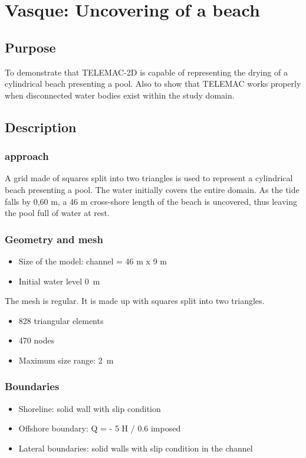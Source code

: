 \chapter{Vasque: Uncovering of  a beach}
\section{Purpose}
To demonstrate that TELEMAC-2D is capable of representing the drying of a
cylindrical beach presenting a pool.
Also to show that TELEMAC works properly when disconnected water bodies exist
within the study domain.

\section{Description}
\subsection{approach}
A grid made of squares split into two triangles is used to represent a
cylindrical beach presenting a pool. The
water initially covers the entire domain. As the tide falls by 0,60 m, a
46 m cross-shore length of the beach is
uncovered, thus leaving the pool full of water at rest.

\subsection{Geometry and mesh}
\begin{itemize}
\item Size of the model: channel = 46 m x 9 m
\item Initial water level 0~m
\end{itemize}

The mesh is regular. It is made up with squares split into two triangles.
\begin{itemize}
\item 828 triangular elements
\item 470 nodes
\item Maximum size range: 2~m
\end{itemize}

\subsection{Boundaries}

\begin{itemize}
\item Shoreline: solid wall with slip condition
\item Offshore boundary: Q = - 5 H / 0.6 imposed
\item Lateral boundaries: solid walls with slip condition in the channel
  \end{itemize}

